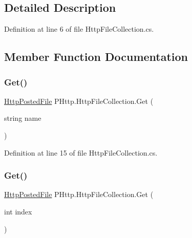 \subsection{Detailed Description}


Definition at line 6 of file Http\+File\+Collection.\+cs.



\subsection{Member Function Documentation}
\mbox{\label{class_p_http_1_1_http_file_collection_a51e9bd9c548f307fc58a13d21c22d6ea}} 
\subsubsection{\texorpdfstring{Get()}{Get()}\hspace{0.1cm}{\footnotesize\ttfamily [1/2]}}
{\footnotesize\ttfamily \hyperlink{class_p_http_1_1_http_posted_file}{Http\+Posted\+File} P\+Http.\+Http\+File\+Collection.\+Get (\begin{DoxyParamCaption}\item[{string}]{name }\end{DoxyParamCaption})}



Definition at line 15 of file Http\+File\+Collection.\+cs.

\mbox{\label{class_p_http_1_1_http_file_collection_ad7091eaa0b20945d7ce3748c3b4a4436}} 
\subsubsection{\texorpdfstring{Get()}{Get()}\hspace{0.1cm}{\footnotesize\ttfamily [2/2]}}
{\footnotesize\ttfamily \hyperlink{class_p_http_1_1_http_posted_file}{Http\+Posted\+File} P\+Http.\+Http\+File\+Collection.\+Get (\begin{DoxyParamCaption}\item[{int}]{index }\end{DoxyParamCaption})}




